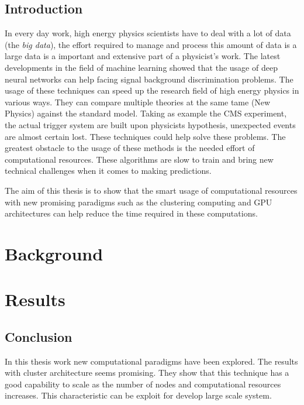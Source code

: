 \documentclass[ twoside,openright,titlepage,numbers=noenddot,%
 headinclude,footinclude,cleardoublepage=empty,abstract=on,
 BCOR=5mm,paper=a4,fontsize=11pt
]{scrreprt}
\theoremstyle{plain}
\begin{document}
\frenchspacing
\raggedbottom
{}
\pagestyle{plain}


\cleardoublepage
\cleardoublepage

\pagestyle{scrheadings}
\chapter{Introduction}
In every day work, high energy physics scientists have to deal with a lot of
data (the \textit{big data}), the effort required to manage and process
this amount of data is a large data is a important and extensive part of a
physicist's work.
The latest developments in the field of machine learning showed that the
usage of deep neural networks can help facing signal background discrimination
problems. The usage of these techniques can speed up the research field of high
energy physics in various ways. They can compare multiple theories at the same
tame (New Physics) against the standard model. Taking as example the CMS
experiment, the actual trigger system are built upon physicists hypothesis,
unexpected events are almost certain lost. These techniques could help solve
these problems. The greatest obstacle to the usage of these methods is the
needed effort of computational resources. These algorithms are slow to train
and bring new technical challenges when it comes to making predictions.

The aim of this thesis is to show that the smart usage of computational
resources with new promising paradigms such as the clustering computing
and GPU architectures can help reduce the time required in these computations.


\part{Background}\label{pt:Background}


\part{Results}\label{pt:results}


\chapter{Conclusion}
In this thesis work new computational paradigms have been explored. The results
with cluster architecture seems promising. They show that this technique has a
good capability to scale as the number of nodes and computational resources
increases. This characteristic can be exploit for develop large scale system.
\end{document}
